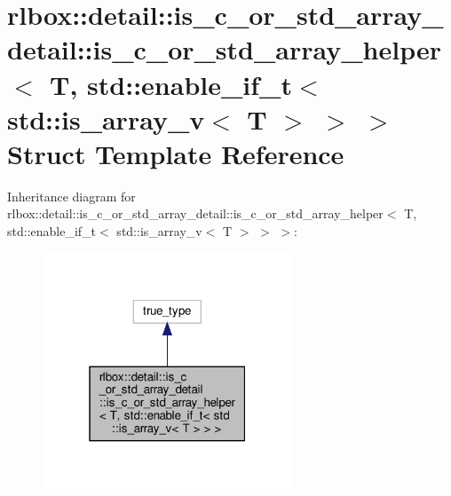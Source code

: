 \hypertarget{structrlbox_1_1detail_1_1is__c__or__std__array__detail_1_1is__c__or__std__array__helper_3_01T_00e23e81f699b5338ffda7a4814dc1a20e}{}\section{rlbox\+:\+:detail\+:\+:is\+\_\+c\+\_\+or\+\_\+std\+\_\+array\+\_\+detail\+:\+:is\+\_\+c\+\_\+or\+\_\+std\+\_\+array\+\_\+helper$<$ T, std\+:\+:enable\+\_\+if\+\_\+t$<$ std\+:\+:is\+\_\+array\+\_\+v$<$ T $>$ $>$ $>$ Struct Template Reference}
\label{structrlbox_1_1detail_1_1is__c__or__std__array__detail_1_1is__c__or__std__array__helper_3_01T_00e23e81f699b5338ffda7a4814dc1a20e}


Inheritance diagram for rlbox\+:\+:detail\+:\+:is\+\_\+c\+\_\+or\+\_\+std\+\_\+array\+\_\+detail\+:\+:is\+\_\+c\+\_\+or\+\_\+std\+\_\+array\+\_\+helper$<$ T, std\+:\+:enable\+\_\+if\+\_\+t$<$ std\+:\+:is\+\_\+array\+\_\+v$<$ T $>$ $>$ $>$\+:
\nopagebreak
\begin{figure}[H]
\begin{center}
\leavevmode
\includegraphics[width=211pt]{structrlbox_1_1detail_1_1is__c__or__std__array__detail_1_1is__c__or__std__array__helper_3_01T_005cef22c49da01f4aae103214978b4e9e}
\end{center}
\end{figure}


